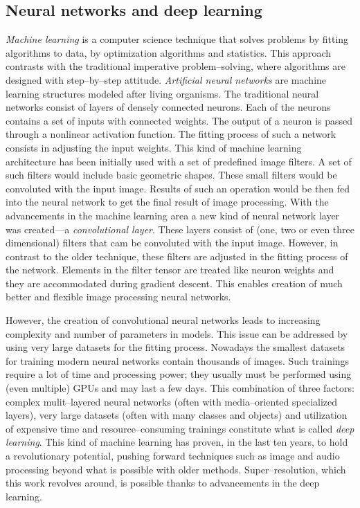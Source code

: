 \subsection{Neural networks and deep learning}
\textit{Machine learning} is a computer science technique that solves problems by fitting algorithms to data, by optimization algorithms and statistics.
This approach contrasts with the traditional imperative problem--solving, where algorithms are designed with step--by--step attitude.
\textit{Artificial neural networks} are machine learning structures modeled after living organisms.
The traditional neural networks consist of layers of densely connected neurons.
Each of the neurons contains a set of inputs with connected weights.
The output of a neuron is passed through a nonlinear activation function.
The fitting process of such a network consists in adjusting the input weights.
This kind of machine learning architecture has been initially used with a set of predefined image filters.
A set of such filters would include basic geometric shapes.
These small filters would be convoluted with the input image.
Results of such an operation would be then fed into the neural network to get the final result of image processing.
With the advancements in the machine learning area a new kind of neural network layer was created---a \textit{convolutional layer}.
These layers consist of (one, two or even three dimensional) filters that cam be convoluted with the input image.
However, in  contrast to the older technique, these filters are adjusted in the fitting process of the network.
Elements in the filter tensor are treated like neuron weights and they are accommodated during gradient descent.
This enables creation of much better and flexible image processing neural networks.

However, the creation of convolutional neural networks leads to increasing complexity and number of parameters in models.
This issue can be addressed by using very large datasets for the fitting process.
Nowadays the smallest datasets for training modern neural networks contain thousands of images.
Such trainings require a lot of time and processing power; they usually must be performed using (even multiple) GPUs and may last a few days.
This combination of three factors: complex mulit--layered neural networks (often with media--oriented specialized layers), very large datasets (often with many classes and objects) and utilization of expensive time and resource--consuming trainings constitute what is called \textit{deep learning}.
This kind of machine learning has proven, in the last ten years, to hold a revolutionary potential, pushing forward techniques such as image and audio processing beyond what is possible with older methods.
Super--resolution, which this work revolves around, is possible thanks to advancements in the deep learning.

